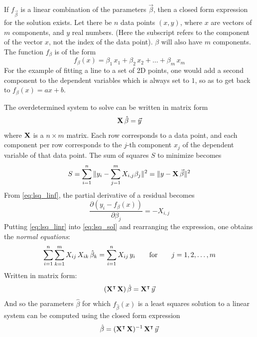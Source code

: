 If $f_{\vec{\beta}}$ is a linear combination of the parameters $\vec{\beta}$, then a closed form expression for the solution exists. Let there be $n$ data points $(x, y)$, where $x$ are vectors of $m$ components, and $y$ real numbers. (Here the subscript refers to the component of the vector $x$, not the index of the data point). $\beta$ will also have $m$ components. The function $f_{\beta}$ is of the form
\begin{equation} \label{eq:lsq_linf}
f_{\beta}(x) = \beta_1 \, x_1 + \beta_2 \, x_2 + \dots + \beta_m \, x_m
\end{equation}
For the example of fitting a line to a set of 2D points, one would add a second component to the dependent variables which is always set to $1$, so as to get back to $f_{\beta}(x) = ax + b$.

The overdetermined system to solve can be written in matrix form
\begin{equation}
\mathbf{X} \, \hat{\beta} = \vec{y}
\end{equation}
where $\mathbf{X}$ is a $n \times m$ matrix. Each row corresponds to a data point, and each component per row corresponds to the $j$-th component $x_j$ of the dependent variable of that data point. The sum of squares $S$ to minimize becomes
\begin{equation}
S = \sum_{i=1}^{n} \| y_i - \sum_{j=1}^{m} X_{i,j} \beta_{j} \|^2 = \| y - \mathbf{X} \, \vec{\beta} \|^2
\end{equation}
From \ref{eq:lsq_linf}, the partial derivative of a residual becomes
\begin{equation} \label{eq:lsq_linr}
\frac{\partial (y_i - f_{\beta}(x))}{\partial \beta_j} = - X_{i,j}
\end{equation}
Putting \ref{eq:lsq_linr} into \ref{eq:lsq_sol} and rearranging the expression, one obtains the \emph{normal equations}:
\begin{equation}
\sum_{i=1}^{n} \sum_{k=1}^{m} X_{ij} \, X_{ik} \, \hat{\beta}_k = \sum_{i=1}^{n} X_{ij} \, y_{i}
\hspace{7mm} \text{for} \hspace{7mm}
j = 1, 2, \dots, m
\end{equation}
Written in matrix form:
\begin{equation}
(\mathbf{X}^\intercal \, \mathbf{X}) \, \hat{\beta} = \mathbf{X}^\intercal \, \vec{y}
\end{equation}
And so the parameters $\hat{\beta}$ for which $f_{\hat{\beta}}(x)$ is a least squares solution to a linear system can be computed using the closed form expression
\begin{equation}
\hat{\beta} = (\mathbf{X}^\intercal \, \mathbf{X})^{-1} \, \mathbf{X}^\intercal \, \vec{y}
\end{equation}

